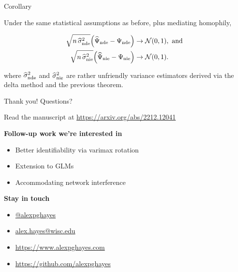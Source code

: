 \documentclass{beamer}
\theoremstyle{remark}
\begin{document}
\begin{frame}{Corollary}

    \begin{theorem}

        \vspace{2mm}

        Under the same statistical assumptions as before, plus mediating homophily,

        \begin{align*}
            \sqrt{n \, \sigmahatnde} \paren*{\ndehat - \nde}
             & \to
            \Normal{0}{1}, \text { and } \\
            \sqrt{n \, \sigmahatnie} \paren*{\niehat - \nie}
             & \to
            \Normal{0}{1}.
        \end{align*}

        \noindent where $\widehat{\sigma}^2_\mathrm{nde}$ and $\widehat{\sigma}^2_\mathrm{nie}$ are rather unfriendly variance estimators derived via the delta method and the previous theorem.

    \end{theorem}

\end{frame}

\begin{frame}{Thank you! Questions?}

    Read the manuscript at \url{https://arxiv.org/abs/2212.12041}

    \textbf{Follow-up work we're interested in}

    \begin{itemize}
        \item Better identifiability via varimax rotation
        \item Extension to GLMs
        \item Accommodating network interference
    \end{itemize}

    \textbf{Stay in touch}

    \begin{itemize}
        \item[]  \href{https://twitter.com/alexpghayes}{@alexpghayes}
        \item[]  \href{mailto:alex.hayes@wisc.edu}{alex.hayes@wisc.edu}
        \item[]  \url{https://www.alexpghayes.com} %
        \item[]  \url{https://github.com/alexpghayes}
    \end{itemize}




\end{frame}
\end{document}

